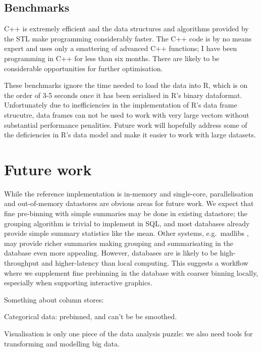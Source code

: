 \documentclass[journal]{vgtc}                %
\begin{document}
\subsection{Benchmarks}
\label{sub:benchmarks}

C++ is extremely efficient and the data structures and algorithms provided by the STL make programming considerably faster.  The C++ code is by no means expert and uses only a smattering of advanced C++ functions; I have been programming in C++ for less than six months. There are likely to be considerable opportunities for further optimisation.

These benchmarks ignore the time needed to load the data into R, which is on the order of 3-5 seconds once it has been serialised in R's binary dataformat.  Unfortunately due to inefficiencies in the implementation of R's data frame strucutre, data frames can not be used to work with very large vectors without substantial performance penalities. Future work will hopefully address some of the deficiencies in R's data model and make it easier to work with large datasets.



\section{Future work}
\label{sec:conclusion}

While the reference implementation is in-memory and single-core, parallelisation and out-of-memory datastores are obvious areas for future work. We expect that fine pre-binning with simple summaries may be done in existing datastore; the grouping algorithm is trivial to implement in SQL, and most databases already provide simple summary statistics like the mean. Other systems, e.g.\ madlibs \citep{hellerstein:2012}, may provide richer summaries making grouping and summarisating in the database even more appealing. However, databases are is likely to be high-throughput and higher-latency than local computing. This suggests a workflow where we supplement fine prebinning in the database with coarser binning locally, especially when supporting interactive graphics.

Something about column stores: \citep{kersten:2011}

Categorical data: prebinned, and can't be be smoothed.

Visualisation is only one piece of the data analysis puzzle: we also need tools for transforming and modelling big data. 





\end{document}
